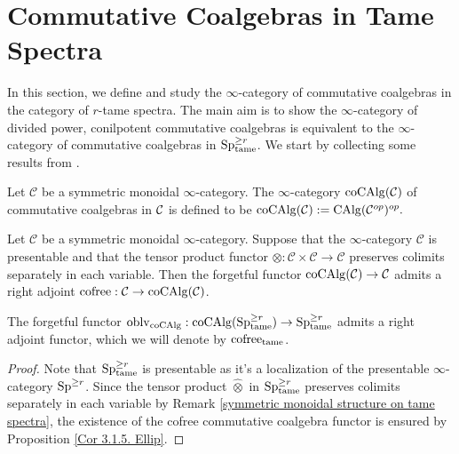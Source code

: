 \section{Commutative Coalgebras in Tame Spectra}
\label{Commutative coalgebras in tame spectra}

In this section, we define and study the $\infty$-category of commutative coalgebras in the category of $r$-tame spectra. 
The main aim is to show the $\infty$-category of divided power, conilpotent commutative coalgebras is equivalent to the $\infty$-category of commutative coalgebras in $\operatorname{Sp}^{\geq r}_{\operatorname{\operatorname{tame}}}$.
We start by collecting some results from \cite{LurieEllipticI}.

\begin{definition}
    Let $\mathcal{C}$ be a symmetric monoidal $\infty$-category. The $\infty$-category $\operatorname{coCAlg}({\mathcal{C}})$ of commutative coalgebras in ${\mathcal{C}}$ is defined to be
    $
    \operatorname{coCAlg}({\mathcal{C}}):= \operatorname{CAlg}({\mathcal{C}}^{op})^{op}.
    $
\end{definition}



\begin{proposition}
\label{Cor 3.1.5. Ellip}
\cite[Corollary 3.1.5]{LurieEllipticI}
	Let $\mathcal{C}$ be a symmetric monoidal $\infty$-category. Suppose that the $\infty$-category $\mathcal{C}$ is presentable and that the tensor product functor $\otimes: \mathcal{C} \times \mathcal{C} \rightarrow \mathcal{C}$ preserves colimits separately in each variable. Then the forgetful functor $\operatorname{coCAlg}(\mathcal{C}) \rightarrow \mathcal{C}$ admits a right adjoint $\operatorname{cofree}: \mathcal{C} \rightarrow \operatorname{coCAlg}(\mathcal{C})$.
\end{proposition}


\begin{corollary}
The forgetful functor $\operatorname{oblv}_{\operatorname{coCAlg}}:\operatorname{coCAlg}(\operatorname{Sp}_{\operatorname{\operatorname{tame}}}^{\geq r})\to \operatorname{Sp}^{\geq r}_{\operatorname{\operatorname{tame}}}$ admits a right adjoint functor, which we will denote by $\operatorname{cofree}_{\operatorname{\operatorname{tame}}}$.
\end{corollary}
\begin{proof}
	 Note that $\operatorname{Sp}^{\geq r}_{\operatorname{\operatorname{tame}}}$ is presentable as it's a localization of the presentable $\infty$-category $\operatorname{Sp}^{\geq r}$. 
	 Since the tensor product $\hat{\otimes}$ in $\operatorname{Sp}_{\operatorname{\operatorname{tame}}}^{\geq r}$ preserves colimits separately in each variable by Remark \ref{symmetric monoidal structure on tame spectra}, the existence of the cofree commutative coalgebra functor is ensured by Proposition \ref{Cor 3.1.5. Ellip}.
	 
\end{proof}


